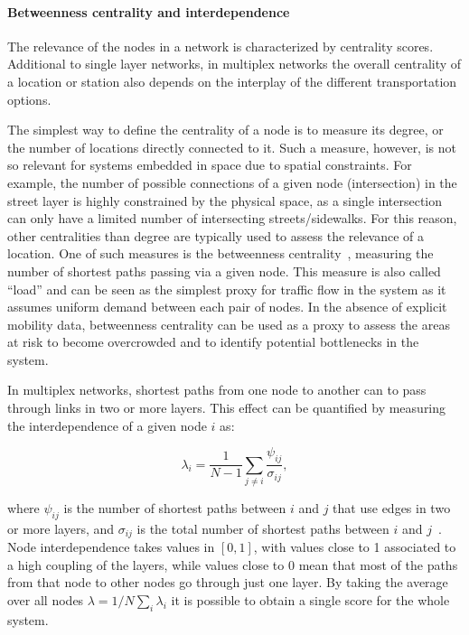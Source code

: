\paragraph*{Betweenness centrality and interdependence}
The relevance of the nodes in a network is characterized by centrality scores. Additional to single layer networks, in multiplex networks the overall centrality of a location or station also depends on the interplay of the different transportation options.

The simplest way to define the centrality of a node is to measure its degree, or the number of locations directly connected to it. Such a measure, however, is not so relevant for systems embedded in space due to spatial constraints. For example, the number of possible connections of a given node (intersection) in the street layer is highly constrained by the physical space, as a single intersection can only have a limited number of intersecting streets/sidewalks. For this reason, other centralities than degree are typically used to assess the relevance of a location. One of such measures is the betweenness centrality~\cite{Freeman1977Centrality}, measuring the number of shortest paths passing via a given node. This measure is also called ``load'' and can be seen as the simplest proxy for traffic flow in the system as it assumes uniform demand between each pair of nodes. In the absence of explicit mobility data, betweenness centrality can be used as a proxy to assess the areas at risk to become overcrowded and to identify potential bottlenecks in the system. 

In multiplex networks, shortest paths from one node to another can to pass through links in two or more layers. This effect can be quantified by measuring the interdependence of a given node $i$ as:

\begin{equation}
    \lambda_i=\frac{1}{N-1}\sum_{j\neq i}\frac{\psi_{ij}}{\sigma_{ij}},
    \label{eq:coupling}
\end{equation}

where $\psi_{ij}$ is the number of shortest paths between $i$ and $j$ that use edges in two or more layers, and $\sigma_{ij}$ is the total number of shortest paths between $i$ and $j$~\cite{morris2012transport,battiston2014structural,strano2015features}. Node interdependence takes values in $[0, 1]$, with values close to 1 associated to a high coupling of the layers, while values close to $0$ mean that most of the paths from that node to other nodes go through just one layer. By taking the average over all nodes $\lambda = 1/N \sum_i\lambda_i$ it is possible to obtain a single score for the whole system. 

